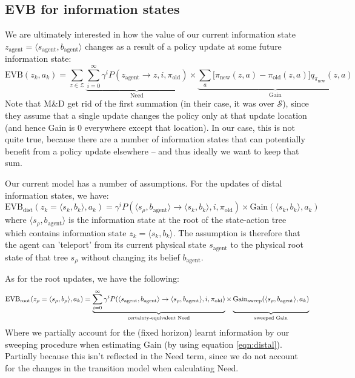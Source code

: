 \documentclass{article}
\newcommand{\old}{\text{old}}
\newcommand{\new}{\text{new}}
\begin{document}
\subsection*{EVB for information states}

We are ultimately interested in how the value of our current information state $z_{\text{agent}} = \langle s_{\text{agent}}, b_{\text{agent}} \rangle$ changes as a result of 
a policy update at some future information state:
\begin{equation}
    \label{eqn:evb}
    \text{EVB}(z_k, a_k) = \sum_{z \in \mathcal{Z}} \underbrace{\sum_{i=0}^{\infty} \gamma^i P(z_{\text{agent}} \rightarrow z, i, \pi_{\old})}_{\text{Need}} \times \underbrace{\sum_a \big[ \pi_{\new}(z, a) - \pi_{\old}(z, a) \big] q_{\pi_{\new}}(z, a)}_{\text{Gain}}
\end{equation}
Note that M\&D get rid of the first summation (in their case, it was over $\mathcal{S}$), since they assume that 
a single update changes the policy only at that update location (and hence Gain is $0$ everywhere except that location). 
In our case, this is not quite true, because there are a number of information states that can potentially benefit from a 
policy update elsewhere -- and thus ideally we want to keep that sum.

\bigbreak

Our current model has a number of assumptions. For the updates of distal information states, we have:
\begin{equation}
    \label{eqn:distal}
    \text{EVB}_{\text{dist}}(z_k=\langle s_k, b_k \rangle, a_k) = \gamma^i P(\langle s_\rho, b_{\text{agent}} \rangle \rightarrow \langle s_k, b_k \rangle, i, \pi_{\old}) \times \text{Gain}(\langle s_k, b_k \rangle, a_k)
\end{equation}
where $\langle s_\rho, b_{\text{agent}} \rangle$ is the information state at the root of the state-action tree which contains information state $z_k=\langle s_k, b_k \rangle$. The assumption is therefore 
that the agent can 'teleport' from its current physical state $s_\text{agent}$ to the physical root state of that tree $s_\rho$ without changing its belief $b_{\text{agent}}$.

\bigbreak

As for the root updates, we have the following:
\begin{equation}
    \label{eqn:root}
    \text{EVB}_{\text{root}}(z_\rho=\langle s_\rho, b_\rho \rangle, a_k) = \underbrace{\sum_{i=0}^{\infty} \gamma^i P(\langle s_{\text{agent}}, b_{\text{agent}} \rangle \rightarrow \langle s_\rho, b_{\text{agent}} \rangle, i, \pi_{\old})}_{\text{certainty-equivalent Need}} \times \underbrace{\text{Gain}_{\text{sweep}}(\langle s_\rho, b_{\text{agent}} \rangle, a_k) \vphantom{\sum_{i=0}^{\infty}}}_{\text{sweeped Gain}}
\end{equation}
Where we partially account for the (fixed horizon) learnt information by our sweeping procedure when estimating Gain (by using equation \ref{eqn:distal}). 
Partially because this isn't reflected in the Need term, since we do not account for the changes in the transition model when calculating Need.
\end{document}
